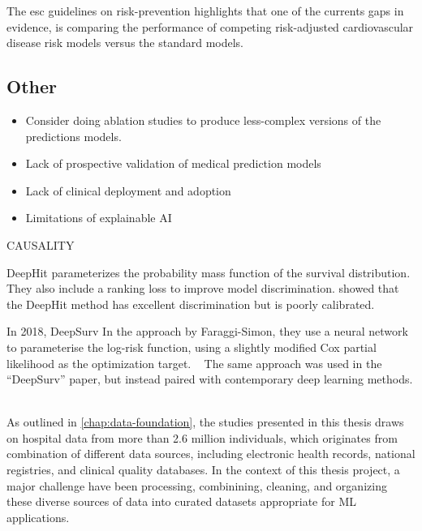 
The esc guidelines on risk-prevention highlights 
that one of the currents gaps in evidence,
is comparing the performance of competing risk-adjusted 
cardiovascular disease risk models versus the standard models.
~\autocite{visseren20212021}

\subsection{Other}


\begin{itemize}
    \item Consider doing ablation studies to produce less-complex versions
        of the predictions models.
    \item Lack of prospective validation of medical prediction models
    \item Lack of clinical deployment and adoption 
    \item Limitations of explainable AI
\end{itemize}

CAUSALITY




DeepHit parameterizes the probability mass function 
of the survival distribution.
They also include a ranking loss to improve model discrimination.
\citeauthor{kvammeContinuous2021} showed that the DeepHit method
has excellent discrimination but is poorly calibrated.



In 2018, DeepSurv 
In the approach by Faraggi-Simon, they use a neural network to 
parameterise the log-risk function, using a slightly modified Cox partial 
likelihood as the optimization target.
~\autocite{faraggiNeural1995}
The same approach was used in the \enquote{DeepSurv} paper,
but instead paired with contemporary deep learning methods.
~\autocite{katzmanDeepSurv2018a}


As outlined in \cref{chap:data-foundation}, 
the studies presented in this thesis draws on hospital data from 
more than \num{2.6} million individuals, which originates from
combination of different data sources, including
electronic health records, national registries, 
and clinical quality databases.
In the context of this thesis project,
a major challenge have been
processing, combinining, cleaning, and 
organizing these diverse sources of data
into curated datasets appropriate for 
\ac{ML} applications.






